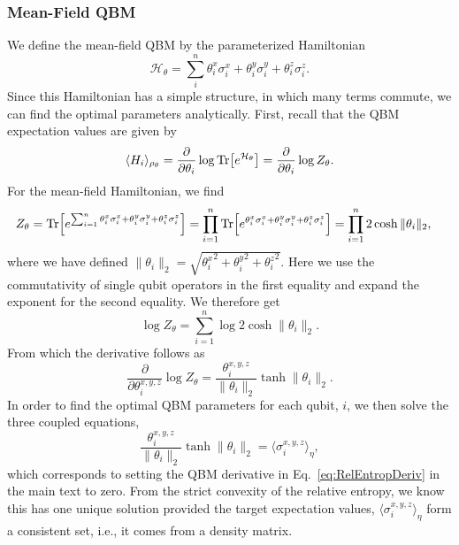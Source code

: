 \documentclass[
    reprint,
    aps,
    prx,
    longbibliography
]{revtex4-2}
\begin{document}
\subsubsection*{Mean-Field QBM}

We define the mean-field QBM by the parameterized Hamiltonian 
 \begin{equation}
    \mathcal{H}_\theta = \sum_i^n \theta^x_i \sigma_i^x + \theta^y_i \sigma_i^y +  \theta^z_i \sigma_i^z.
\end{equation} Since this Hamiltonian has a simple structure, in which many terms commute, we can find the optimal parameters analytically. First, recall that the QBM expectation values are given by \begin{equation}
    \langle H_i\rangle_{\rho_\theta} = \frac{\partial}{\partial \theta_i} \log{\Tr[e^{\mathcal{H}_\theta}]} =  \frac{\partial}{\partial \theta_i}\log{Z_\theta}. 
\end{equation} 
For the mean-field Hamiltonian, we find 
\begin{align}
    Z_\theta &= \Tr[e^{\sum_{i=1}^n\theta^x_i \sigma_i^x + \theta^y_i \sigma_i^y +  \theta^z_i \sigma_i^z}]
    =\prod_{i=1}^n \Tr[ e^{\theta^x_i \sigma_i^x + \theta^y_i \sigma_i^y + \theta^z_i \sigma_i^z}]
    = \prod_{i=1}^n 2\cosh{\|\theta_i\|_2},
\end{align} 
where we have defined $\|\theta_i\|_2=\sqrt{ {\theta_i^x}^2 + {\theta_i^y}^2 +{\theta_i^z}^2}$. Here we use the commutativity of single qubit operators in the first equality and expand the exponent for the second equality.  We therefore get \begin{equation}
\log{Z_\theta} = \sum^n_{i=1} \log{2\cosh{ \| \theta_i \|_2}}. 
\end{equation} 
From which the derivative follows as 
\begin{equation}
    \frac{\partial}{\partial \theta_i^{x,y,z}} \log{Z_\theta}
    = \frac{\theta_i^{x,y,z}}{\|\theta_i\|_2} \tanh{\|\theta_i\|_2}. 
\end{equation} 
In order to find the optimal QBM parameters for each qubit, $i$, we then solve the three coupled equations,
\begin{equation}
\label{eq:MFcoupled}
    \frac{\theta_i^{x,y,z}}{\|\theta_i\|_2} \tanh{\|\theta_i\|_2} = \langle \sigma_i^{x,y,z}\rangle_\eta,
\end{equation} 
which corresponds to setting the QBM derivative in Eq.~\eqref{eq:RelEntropDeriv} in the main text to zero. From the strict convexity of the relative entropy, we know this has one unique solution provided the target expectation values, $\langle \sigma_i^{x,y,z}\rangle_\eta$ form a consistent set, i.e., it comes from a density matrix. 
\end{document}
